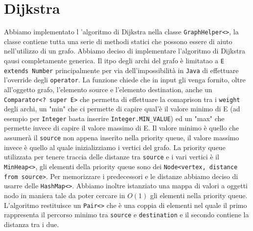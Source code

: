 \documentclass[12pt, letterpaper]{report}
\begin{document}
\section{Dijkstra}
Abbiamo implementato l 'algoritmo di Dijkstra nella classe \verb|GraphHelper<>|, 
la classe contiene tutta una serie di methodi statici che possono essere di aiuto 
nell'utilizzo di un grafo. \newline
Abbiamo deciso di implementare l'algoritmo di Dijkstra qausi completamente generica.
Il itpo degli archi del grafo è limitatao a \verb|E extends Number| principalmente 
per via dell'impossibilità in \verb|Java| di effettuare l'override degli \verb|operator|.
\newline
La funzione chiede che in input gli venga fornito, oltre all'oggetto grafo, l'elemento 
source e l'elemento destination, anche un \verb|Comparator<? super E>| che 
permetta di effettuare la comaprison tra i \verb|weight| degli archi, un "min" che ci 
permette di capire qual'è il valore minimo di E (ad esempio per \verb|Integer| basta inserire 
\verb|Integer.MIN_VALUE|) ed un "max" che permette invece di capire il valore massimo di
E. Il valore minimo è quello che assumerà il \verb|source| non appena inserito nella
priority queue, il valore massimo invece è quello al quale inizializziamo i vertici
del grafo. \newline
La priority queue utilizzata per tenere traccia delle distanze tra \verb|source| e
i vari vertici è il \verb|MinHeap<>|, gli elementi della priority queue sono dei 
\verb|Node<vertex, distance from source>|. \newline
Per memorizzare i predecessori e le distanze abbiamo deciso di usarre delle 
\verb|HashMap<>|. \newline
Abbiamo inoltre istanziato una mappa di valori a oggetti nodo in maniera tale da 
poter cercare in $O(1)$ gli elementi nella priority queue. \newline
L'algoritmo restituisce un \verb|Pair<>| che è una coppia di elementi nel quale il
primo rappresenta il percorso minimo tra \verb|source| e \verb|destination| e il 
secondo contiene la distanza tra i due.
\end{document}

